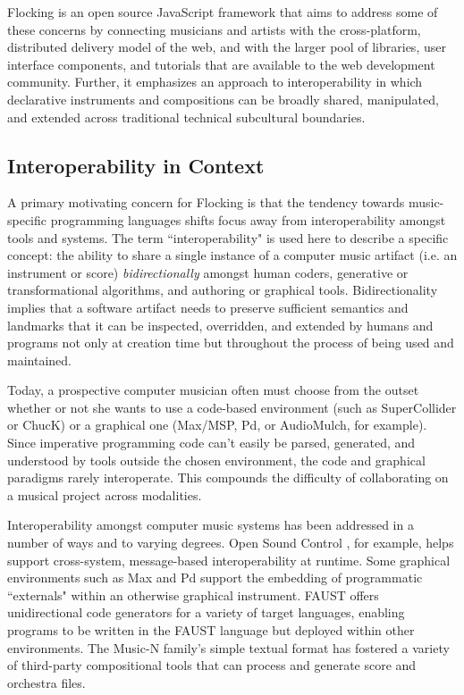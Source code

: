 \documentclass{article}
\begin{document}
Flocking is an open source JavaScript framework that aims to address some of these concerns by connecting musicians and artists with the cross-platform, distributed delivery model of the web, and with the larger pool of libraries, user interface components, and tutorials that are available to the web development community. Further, it emphasizes an approach to interoperability in which declarative instruments and compositions can be broadly shared, manipulated, and extended across traditional technical subcultural boundaries.

\subsection{Interoperability in Context}

A primary motivating concern for Flocking is that the tendency towards music-specific programming languages shifts focus away from interoperability amongst tools and systems. The term ``interoperability" is used here to describe a specific concept: the ability to share a single instance of a computer music artifact (i.e. an instrument or score) {\it bidirectionally} amongst human coders, generative or transformational algorithms, and authoring or graphical tools. Bidirectionality implies that a software artifact needs to preserve sufficient semantics and landmarks that it can be inspected, overridden, and extended by humans and programs not only at creation time but throughout the process of being used and maintained.

Today, a prospective computer musician often must choose from the outset whether or not she wants to use a code-based environment (such as SuperCollider or ChucK) or a graphical one (Max/MSP, Pd, or AudioMulch, for example). Since imperative programming code can't easily be parsed, generated, and understood by tools outside the chosen environment, the code and graphical paradigms rarely interoperate. This compounds the difficulty of collaborating on a musical project across modalities.

Interoperability amongst computer music systems has been addressed in a number of ways and to varying degrees. Open Sound Control \cite{wright1997open}, for example, helps support cross-system, message-based interoperability at runtime. Some graphical environments such as Max and Pd support the embedding of programmatic ``externals" within an otherwise graphical instrument. FAUST offers unidirectional code generators for a variety of target languages, enabling programs to be written in the FAUST language but deployed within other environments. The Music-N family's simple textual format has fostered a variety of third-party compositional tools that can process and generate score and orchestra files.
\end{document}
